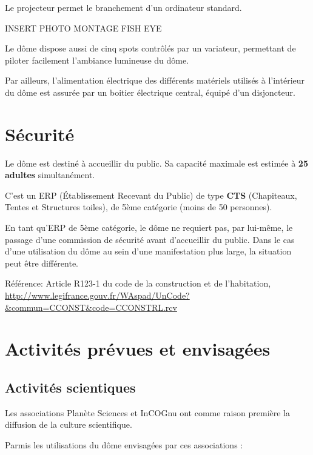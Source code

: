 \documentclass[a4paper,12pt]{report}
\begin{document}
Le projecteur permet le branchement d'un ordinateur standard.

INSERT PHOTO MONTAGE FISH EYE

Le dôme dispose aussi de cinq spots contrôlés par un variateur, permettant de
piloter facilement l'ambiance lumineuse du dôme.

Par ailleurs, l'alimentation électrique des différents matériels utilisés à
l'intérieur du dôme est assurée par un boitier électrique central, équipé d'un
disjoncteur.

\chapter{Sécurité}

Le dôme est destiné à accueillir du public. Sa capacité maximale est estimée à
\textbf{25 adultes} simultanément.

C'est un ERP (Établissement Recevant du Public) de type \textbf{CTS}
(Chapiteaux, Tentes et Structures toiles), de 5ème catégorie (moins de 50
personnes).

En tant qu'ERP de 5ème catégorie, le dôme ne requiert pas, par lui-même, le
passage d'une commission de sécurité avant d'accueillir du public. Dans le cas
d'une utilisation du dôme au sein d'une manifestation plus large, la situation
peut être différente.

Référence: Article R123-1 du code de la construction et de l'habitation,
\url{http://www.legifrance.gouv.fr/WAspad/UnCode?&commun=CCONST&code=CCONSTRL.rcv}

\chapter{Activités prévues et envisagées}

\section{Activités scientiques}

Les associations Planète Sciences et InCOGnu ont comme raison première la
diffusion de la culture scientifique.

Parmis les utilisations du dôme envisagées par ces associations :
\end{document}
